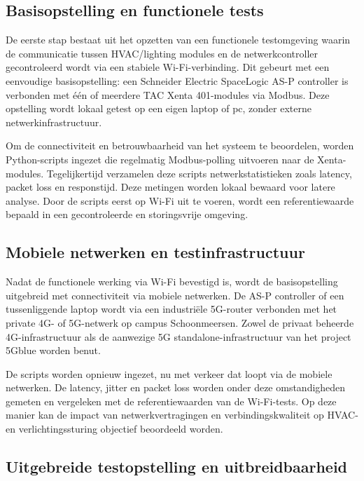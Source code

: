 \subsection{Basisopstelling en functionele tests}

De eerste stap bestaat uit het opzetten van een functionele testomgeving waarin de communicatie tussen HVAC/lighting modules en de netwerkcontroller gecontroleerd wordt via een stabiele Wi-Fi-verbinding. Dit gebeurt met een eenvoudige basisopstelling: een Schneider Electric SpaceLogic AS-P controller is verbonden met één of meerdere TAC Xenta 401-modules via Modbus. Deze opstelling wordt lokaal getest op een eigen laptop of pc, zonder externe netwerkinfrastructuur.

Om de connectiviteit en betrouwbaarheid van het systeem te beoordelen, worden Python-scripts ingezet die regelmatig Modbus-polling uitvoeren naar de Xenta-modules. Tegelijkertijd verzamelen deze scripts netwerkstatistieken zoals latency, packet loss en responstijd. Deze metingen worden lokaal bewaard voor latere analyse. Door de scripts eerst op Wi-Fi uit te voeren, wordt een referentiewaarde bepaald in een gecontroleerde en storingsvrije omgeving.

\subsection{Mobiele netwerken en testinfrastructuur}

Nadat de functionele werking via Wi-Fi bevestigd is, wordt de basisopstelling uitgebreid met connectiviteit via mobiele netwerken. De AS-P controller of een tussenliggende laptop wordt via een industriële 5G-router verbonden met het private 4G- of 5G-netwerk op campus Schoonmeersen. Zowel de privaat beheerde 4G-infrastructuur als de aanwezige 5G standalone-infrastructuur van het project 5Gblue worden benut.

De scripts worden opnieuw ingezet, nu met verkeer dat loopt via de mobiele netwerken. De latency, jitter en packet loss worden onder deze omstandigheden gemeten en vergeleken met de referentiewaarden van de Wi-Fi-tests. Op deze manier kan de impact van netwerkvertragingen en verbindingskwaliteit op HVAC- en verlichtingssturing objectief beoordeeld worden.

\subsection{Uitgebreide testopstelling en uitbreidbaarheid}

